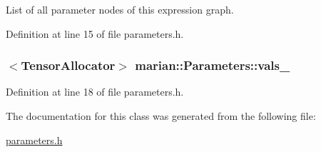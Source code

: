 List of all parameter nodes of this expression graph. 



Definition at line 15 of file parameters.\+h.

\subsubsection[{\texorpdfstring{vals\+\_\+}{vals_}}]{$<${\bf Tensor\+Allocator}$>$ marian\+::\+Parameters\+::vals\+\_\+\hspace{0.3cm}{\ttfamily [private]}}\hypertarget{classmarian_1_1Parameters_ab4322d7d784c527dd738f256a6731a16}{}\label{classmarian_1_1Parameters_ab4322d7d784c527dd738f256a6731a16}


Definition at line 18 of file parameters.\+h.



The documentation for this class was generated from the following file\+:\begin{DoxyCompactItemize}
\item 
\hyperlink{parameters_8h}{parameters.\+h}\end{DoxyCompactItemize}
